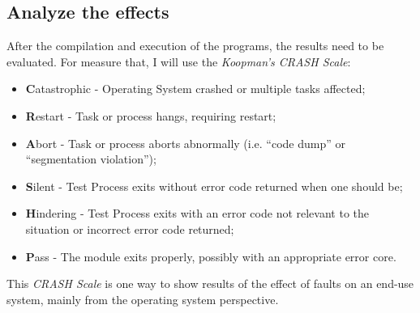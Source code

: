 
\subsection{Analyze the effects}


After the compilation and execution of the programs, the results need to be evaluated. For measure that, I will use the \textit{Koopman's CRASH Scale}\cite{koopman1997comparing}:

\begin{itemize}
	\item \textbf{C}atastrophic - Operating System crashed or multiple tasks affected;
	\item \textbf{R}estart - Task or process hangs, requiring restart;
	\item \textbf{A}bort - Task or process aborts abnormally (i.e. ``code dump'' or ``segmentation violation'');
	\item \textbf{S}ilent - Test Process exits without error code returned when one should be;
	\item \textbf{H}indering - Test Process exits with an error code not relevant to the situation or incorrect error code returned;
	\item \textbf{P}ass - The module exits properly, possibly with an appropriate error core.
\end{itemize}

This \textit{CRASH Scale} is one way to show results of the effect of faults on an end-use system, mainly from the operating system perspective.